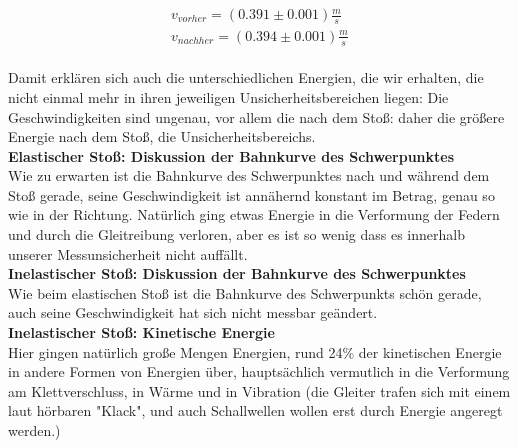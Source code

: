 \documentclass{article}
\begin{document}
\begin{gather*}
v_{vorher}=(0.391 \pm 0.001) \frac{m}{s} \\
v_{nachher}=( 0.394 \pm 0.001) \frac{m}{s}
\end{gather*}\\
Damit erklären sich auch die unterschiedlichen Energien, die wir erhalten, die nicht einmal mehr in ihren jeweiligen Unsicherheitsbereichen liegen: Die Geschwindigkeiten sind ungenau, vor allem die nach dem Stoß: daher die größere Energie nach dem Stoß, die  Unsicherheitsbereichs.\\
\textbf{Elastischer Stoß: Diskussion der Bahnkurve des Schwerpunktes}\\
Wie zu erwarten ist die Bahnkurve des Schwerpunktes nach und während dem Stoß gerade, seine Geschwindigkeit ist annähernd konstant im Betrag, genau so wie in der Richtung. Natürlich ging etwas Energie in die Verformung der Federn und durch die Gleitreibung verloren, aber es ist so wenig dass es innerhalb unserer Messunsicherheit nicht auffällt.\\
\textbf{Inelastischer Stoß: Diskussion der Bahnkurve des Schwerpunktes}\\
Wie beim elastischen Stoß ist die Bahnkurve des Schwerpunkts schön gerade, auch seine Geschwindigkeit hat sich nicht messbar geändert.\\
\textbf{Inelastischer Stoß: Kinetische Energie}\\
Hier gingen natürlich große Mengen Energien, rund 24\% der kinetischen Energie in andere Formen von Energien über, hauptsächlich vermutlich in die Verformung am Klettverschluss, in Wärme und in Vibration (die Gleiter trafen sich mit einem laut hörbaren "Klack", und auch Schallwellen wollen erst durch Energie angeregt werden.)
\end{document}
